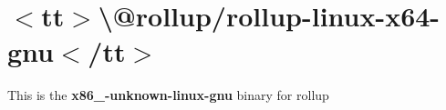 \chapter{\texorpdfstring{$<$}{<}tt\texorpdfstring{$>$}{>}\textbackslash{}@rollup/rollup-\/linux-\/x64-\/gnu\texorpdfstring{$<$}{<}/tt\texorpdfstring{$>$}{>}}
\hypertarget{md__2home_2solype_2delivery_2current__days_2Mannheim_2front_2node__modules_2_0drollup_2rollup-linux-x64-gnu_2README}{}\label{md__2home_2solype_2delivery_2current__days_2Mannheim_2front_2node__modules_2_0drollup_2rollup-linux-x64-gnu_2README}
\label{md__2home_2solype_2delivery_2current__days_2Mannheim_2front_2node__modules_2_0drollup_2rollup-linux-x64-gnu_2README_autotoc_md690}%
%
 This is the {\bfseries{x86\+\_-\/unknown-\/linux-\/gnu}} binary for {\ttfamily rollup} 
